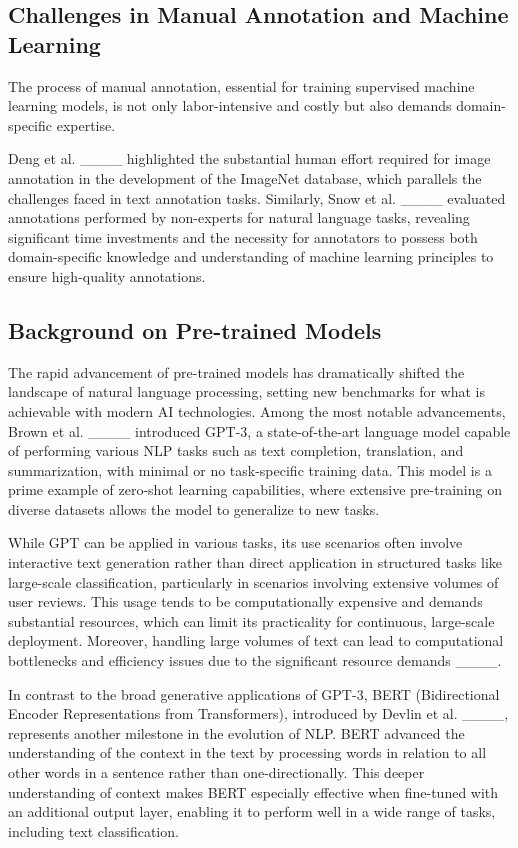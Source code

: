 \subsection{Challenges in Manual Annotation and Machine Learning}
The process of manual annotation, essential for training supervised machine learning models, is not only labor-intensive and costly but also demands domain-specific expertise.

Deng et al. ____ highlighted the substantial human effort required for image annotation in the development of the ImageNet database, which parallels the challenges faced in text annotation tasks. Similarly, Snow et al. ____ evaluated annotations performed by non-experts for natural language tasks, revealing significant time investments and the necessity for annotators to possess both domain-specific knowledge and understanding of machine learning principles to ensure high-quality annotations.


\subsection{Background on Pre-trained Models}

The rapid advancement of pre-trained models has dramatically shifted the landscape of natural language processing, setting new benchmarks for what is achievable with modern AI technologies. Among the most notable advancements, Brown et al. ____ introduced GPT-3, a state-of-the-art language model capable of performing various NLP tasks such as text completion, translation, and summarization, with minimal or no task-specific training data. This model is a prime example of zero-shot learning capabilities, where extensive pre-training on diverse datasets allows the model to generalize to new tasks.

While GPT can be applied in various tasks, its use scenarios often involve interactive text generation rather than direct application in structured tasks like large-scale classification, particularly in scenarios involving extensive volumes of user reviews. This usage tends to be computationally expensive and demands substantial resources, which can limit its practicality for continuous, large-scale deployment. Moreover, handling large volumes of text can lead to computational bottlenecks and efficiency issues due to the significant resource demands ____.




In contrast to the broad generative applications of GPT-3, BERT (Bidirectional Encoder Representations from Transformers), introduced by Devlin et al. ____, represents another milestone in the evolution of NLP. BERT advanced the understanding of the context in the text by processing words in relation to all other words in a sentence rather than one-directionally. This deeper understanding of context makes BERT especially effective when fine-tuned with an additional output layer, enabling it to perform well in a wide range of tasks, including text classification.

